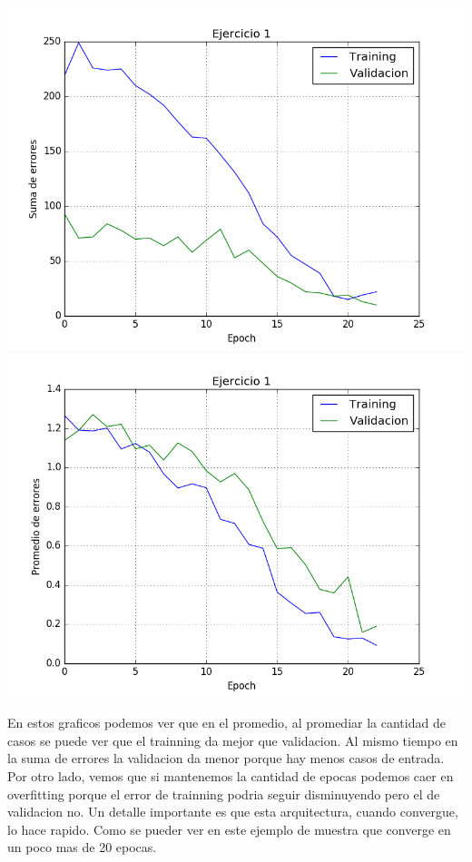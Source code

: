 \includegraphics[scale=0.4]{img/ej100109155sum}
\includegraphics[scale=0.4]{img/ej100109155mean}

En estos graficos podemos ver que en el promedio, al promediar la cantidad de casos se puede ver que el trainning da mejor que validacion. Al mismo tiempo en la suma de errores la validacion da menor porque hay menos casos de entrada. 
Por otro lado, vemos que si mantenemos la cantidad de epocas podemos caer en overfitting porque el error de trainning podria seguir disminuyendo pero el de validacion no.
Un detalle importante es que esta arquitectura, cuando convergue, lo hace rapido. Como se pueder ver en este ejemplo de muestra que converge en un poco mas de 20 epocas.

